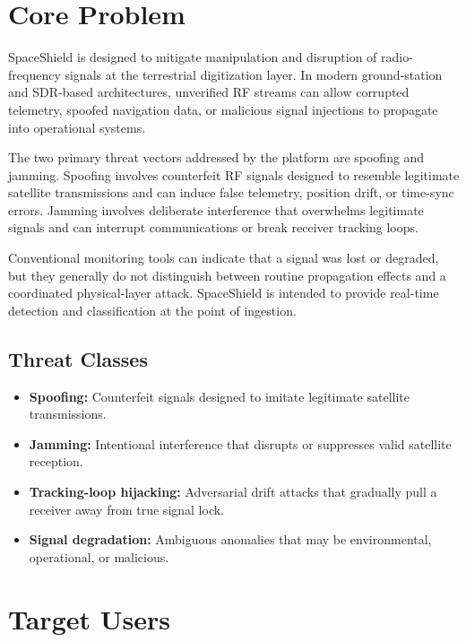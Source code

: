 \documentclass[11pt,a4paper]{article}
\begin{document}
\section{Core Problem}

SpaceShield is designed to mitigate manipulation and disruption of radio-frequency signals at the terrestrial digitization layer. In modern ground-station and SDR-based architectures, unverified RF streams can allow corrupted telemetry, spoofed navigation data, or malicious signal injections to propagate into operational systems.

The two primary threat vectors addressed by the platform are spoofing and jamming. Spoofing involves counterfeit RF signals designed to resemble legitimate satellite transmissions and can induce false telemetry, position drift, or time-sync errors. Jamming involves deliberate interference that overwhelms legitimate signals and can interrupt communications or break receiver tracking loops.

Conventional monitoring tools can indicate that a signal was lost or degraded, but they generally do not distinguish between routine propagation effects and a coordinated physical-layer attack. SpaceShield is intended to provide real-time detection and classification at the point of ingestion.

\subsection{Threat Classes}

\begin{itemize}
    \item \textbf{Spoofing:} Counterfeit signals designed to imitate legitimate satellite transmissions.
    \item \textbf{Jamming:} Intentional interference that disrupts or suppresses valid satellite reception.
    \item \textbf{Tracking-loop hijacking:} Adversarial drift attacks that gradually pull a receiver away from true signal lock.
    \item \textbf{Signal degradation:} Ambiguous anomalies that may be environmental, operational, or malicious.
\end{itemize}

\section{Target Users}
\end{document}
